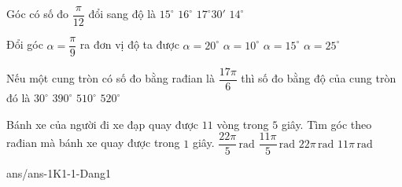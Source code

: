 \begin{ex}%
	Góc có số đo $\dfrac{\pi}{12}$ đổi sang độ là
	\choice
	{\True  $15^\circ$}
	{$16^\circ$}
	{$17^\circ 30'$}
	{$14^\circ$}
\end{ex}
\begin{ex}%
	Đổi góc $\alpha=\dfrac{\pi}{9}$ ra đơn vị độ ta được
	\choice
	{\True $\alpha=20^\circ$}
	{$\alpha=10^\circ$}
	{$\alpha=15^\circ$}
	{$\alpha=25^\circ$}
\end{ex}
\begin{ex}%
	Nếu một cung tròn có số đo bằng rađian là $\dfrac{17\pi }{6}$ thì số đo bằng độ của cung tròn đó là
	\choice
	{$30^{\circ}$}
	{$390^{\circ}$}
	{\True $510^{\circ}$}
	{$520^{\circ}$}
\end{ex}
\begin{ex}%
	Bánh xe của người đi xe đạp quay được $11$ vòng trong $5$ giây. Tìm góc theo rađian mà bánh xe quay được trong $1$ giây.
	\choice
	{\True$\dfrac{22\pi}{5}\,\mathrm{rad}$}
	{$\dfrac{11\pi}{5}\,\mathrm{rad}$}
	{$22\pi\,\mathrm{rad}$}
	{$11\pi\,\mathrm{rad}$}
\end{ex}
\begin{indapan}{10}
	{ans/ans-1K1-1-Dang1}
\end{indapan}